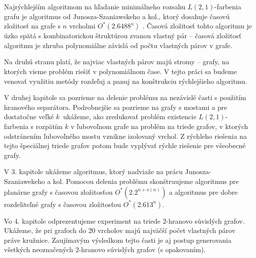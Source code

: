 Najrýchlejším algoritmom na hľadanie minimálneho rozsahu $L(2,1)$-farbenia grafu
je algoritmus od Junosza-Szaniawskeho a kol., ktorý dosahuje časovú zložitosť
na grafe s $n$ vrcholmi $O^*(2.6488^n)$ \cite{junosza_fast}. Časová zložitosť tohto algoritmu je úzko spätá
s kombinatorickou štruktúrou zvanou vlastný pár -- časová zložitosť algoritmu je
zhruba polynomiálne závislá od počtu vlastných párov v grafe.

Na druhú stranu platí, že najviac vlastných párov majú stromy -- grafy, na ktorých
vieme problém riešiť v polynomiálnom čase. V tejto práci sa budeme venovať využitiu
metódy rozdeľuj a panuj na konštrukciu rýchlejšieho algoritmu.

V druhej kapitole sa pozrieme na delenie problému na nezávislé časti s použitím
hranového separátora. Podrobnejšie sa pozrieme na grafy s mostami a pre dostatočne
veľké $k$ ukážeme, ako zredukovať problém existencie $L(2,1)$-farbenia s rozpätím $k$
v ľubovoľnom grafe na problém na triede grafov, v ktorých odstránením ľubovoľného mostu vznikne izolovaný
vrchol. Z rýchleho riešenia na tejto špeciálnej triede grafov potom bude vyplývať
rýchle riešenie pre všeobecné grafy.

V 3. kapitole ukážeme algoritmus, ktorý nadviaže na prácu Junosza-Szaniawekeho a kol.
Pomocou delenia problému skonštruujeme algoritmus pre planárne grafy s časovou
zložitosťou $O^*(2.2^{n+ o(n)})$ a algoritmus pre dobre rozdeliteľné grafy s časovou
zložitosťou $O^*(2.613^n)$.

Vo 4. kapitole odprezentujeme experiment na triede $2$-hranovo súvislých grafov.
Ukážeme, že pri grafoch do $20$ vrcholov majú najväčší počet vlastných párov
práve kružnice. Zaujímavým výsledkom tejto časti je aj postup generovania všetkých
neoznačených $2$-hranovo súvislých grafov (s opakovaním).
